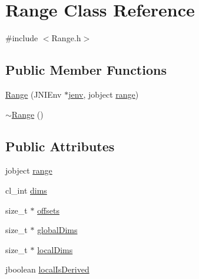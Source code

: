 \hypertarget{class_range}{\section{Range Class Reference}
\label{class_range}
}


{\ttfamily \#include $<$Range.\-h$>$}

\subsection*{Public Member Functions}
\begin{DoxyCompactItemize}
\item 
\hyperlink{class_range_a8a89dec3983749aaeb6905c5eff0bf52}{Range} (J\-N\-I\-Env $\ast$\hyperlink{aparapi_8cpp_a31595c73e9a3750524b2ff61b5a14f96}{jenv}, jobject \hyperlink{class_range_a08ece25fa240f3740da132631ea7094d}{range})
\item 
\hyperlink{class_range_a2b3ba4f69eaa564dd67a5e8e70aab835}{$\sim$\-Range} ()
\end{DoxyCompactItemize}
\subsection*{Public Attributes}
\begin{DoxyCompactItemize}
\item 
jobject \hyperlink{class_range_a08ece25fa240f3740da132631ea7094d}{range}
\item 
cl\-\_\-int \hyperlink{class_range_a38f24294ffc465eb04c849264d77c09e}{dims}
\item 
size\-\_\-t $\ast$ \hyperlink{class_range_a66dc18cc0c4e4b72c0cc33fa93fbb9d1}{offsets}
\item 
size\-\_\-t $\ast$ \hyperlink{class_range_af04212e4c0ca0751e0a14cbb7bba6854}{global\-Dims}
\item 
size\-\_\-t $\ast$ \hyperlink{class_range_a6812424b5870a00b4ca9496948b699a5}{local\-Dims}
\item 
jboolean \hyperlink{class_range_a3bd6dc4d33fd89acf2bd6ce4d9ecab5a}{local\-Is\-Derived}
\end{DoxyCompactItemize}
